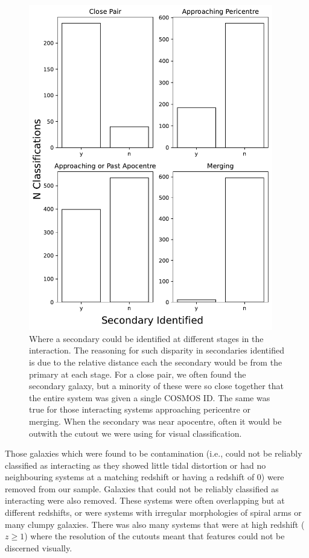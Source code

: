 \begin{figure}
    \centering
    \includegraphics[width=0.95\textwidth]{Chapter3/figures/visualisation_classification.pdf}
    \caption[Where a secondary could be identified at different stages in the interaction.]{Where a secondary could be identified at different stages in the interaction. The reasoning for such disparity in secondaries identified is due to the relative distance each the secondary would be from the primary at each stage. For a close pair, we often found the secondary galaxy, but a minority of these were so close together that the entire system was given a single COSMOS ID. The same was true for those interacting systems approaching pericentre or merging. When the secondary was near apocentre, often it would be outwith the cutout we were using for visual classification.}
    \label{fig:secondaries_found}
\end{figure}

Those galaxies which were found to be contamination (i.e., could not be reliably classified as interacting as they showed little tidal distortion or had no neighbouring systems at a matching redshift or having a redshift of 0) were removed from our sample. Galaxies that could not be reliably classified as interacting were also removed. These systems were often overlapping but at different redshifts, or were systems with irregular morphologies of spiral arms or many clumpy galaxies. There was also many systems that were at high redshift ($z \geq 1$) where the resolution of the cutouts meant that features could not be discerned visually.

